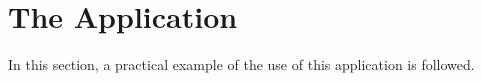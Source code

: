 \chapter{The Application}

In this section, a practical example of the use of this application is followed.


